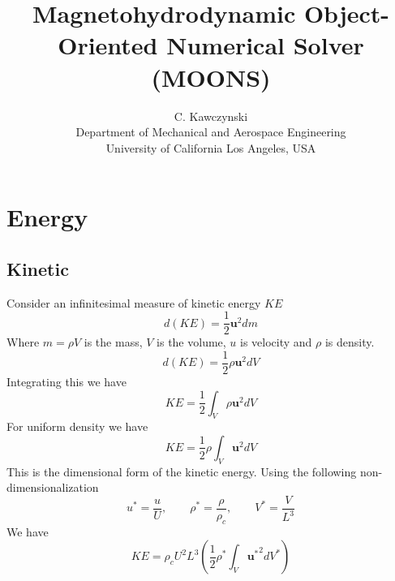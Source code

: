 \documentclass[11pt]{article}
\begin{document}
\doublespacing
\title{Magnetohydrodynamic Object-Oriented Numerical Solver (MOONS)}
\author{C. Kawczynski \\
Department of Mechanical and Aerospace Engineering \\
University of California Los Angeles, USA\\
}
\maketitle

\section{Energy}

\subsection{Kinetic}
Consider an infinitesimal measure of kinetic energy $KE$
\begin{equation}
	d(KE) = \frac{1}{2} \mathbf{u}^2 dm
\end{equation}
Where $m=\rho V$ is the mass, $V$ is the volume, $u$ is velocity and $\rho$ is density.
\begin{equation}
	d(KE) = \frac{1}{2} \rho \mathbf{u}^2 dV
\end{equation}
Integrating this we have
\begin{equation}
	KE = \frac{1}{2} \int_V \rho \mathbf{u}^2 dV
\end{equation}
For uniform density we have
\begin{equation}
	KE = \frac{1}{2} \rho \int_V \mathbf{u}^2 dV
\end{equation}
This is the dimensional form of the kinetic energy. Using the following non-dimensionalization
\begin{equation}
	u^* = \frac{u}{U},
	\qquad
	\rho^* = \frac{\rho}{\rho_c},
	\qquad
	V^* = \frac{V}{L^3}
\end{equation}
We have
\begin{equation}
	\boxed{
	KE = \rho_c U^2 L^3 \left( \frac{1}{2} \rho^* \int_V {\mathbf{u}^*}^2 dV^* \right)
	}
\end{equation}
\end{document}
